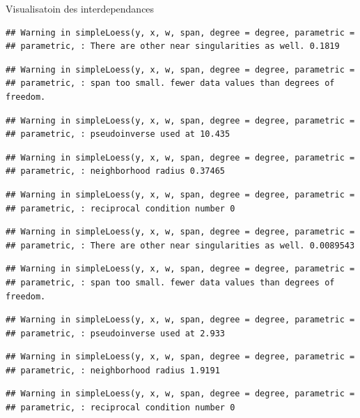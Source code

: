 \documentclass[11pt,ignorenonframetext,]{beamer}
\begin{document}
\begin{frame}[fragile]{Visualisatoin des interdependances}
\begin{verbatim}
## Warning in simpleLoess(y, x, w, span, degree = degree, parametric =
## parametric, : There are other near singularities as well. 0.1819
\end{verbatim}

\begin{verbatim}
## Warning in simpleLoess(y, x, w, span, degree = degree, parametric =
## parametric, : span too small. fewer data values than degrees of freedom.
\end{verbatim}

\begin{verbatim}
## Warning in simpleLoess(y, x, w, span, degree = degree, parametric =
## parametric, : pseudoinverse used at 10.435
\end{verbatim}

\begin{verbatim}
## Warning in simpleLoess(y, x, w, span, degree = degree, parametric =
## parametric, : neighborhood radius 0.37465
\end{verbatim}

\begin{verbatim}
## Warning in simpleLoess(y, x, w, span, degree = degree, parametric =
## parametric, : reciprocal condition number 0
\end{verbatim}

\begin{verbatim}
## Warning in simpleLoess(y, x, w, span, degree = degree, parametric =
## parametric, : There are other near singularities as well. 0.0089543
\end{verbatim}

\begin{verbatim}
## Warning in simpleLoess(y, x, w, span, degree = degree, parametric =
## parametric, : span too small. fewer data values than degrees of freedom.
\end{verbatim}

\begin{verbatim}
## Warning in simpleLoess(y, x, w, span, degree = degree, parametric =
## parametric, : pseudoinverse used at 2.933
\end{verbatim}

\begin{verbatim}
## Warning in simpleLoess(y, x, w, span, degree = degree, parametric =
## parametric, : neighborhood radius 1.9191
\end{verbatim}

\begin{verbatim}
## Warning in simpleLoess(y, x, w, span, degree = degree, parametric =
## parametric, : reciprocal condition number 0
\end{verbatim}


\end{frame}
\end{document}
